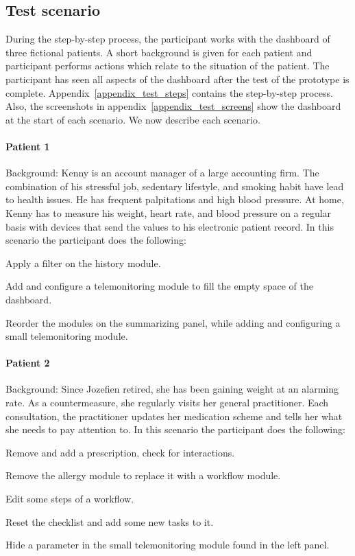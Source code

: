     \subsection{Test scenario}

    During the step-by-step process, the participant works with the dashboard of three fictional patients. A short background is given for each patient and participant performs actions which relate to the situation of the patient. The participant has seen all aspects of the dashboard after the test of the prototype is complete. Appendix~\ref{appendix_test_steps} contains the step-by-step process. Also, the screenshots in appendix~\ref{appendix_test_screens} show the dashboard at the start of each scenario. We now describe each scenario.

    \paragraph{Patient 1} Background: Kenny is an account manager of a large accounting firm. The combination of his stressful job, sedentary lifestyle, and smoking habit have lead to health issues. He has frequent palpitations and high blood pressure. At home, Kenny has to measure his weight, heart rate, and blood pressure on a regular basis with devices that send the values to his electronic patient record. In this scenario the participant does the following:
    \vspace{-6pt}
    \begin{myenumerate}
        \item Apply a filter on the history module.
        \item Add and configure a telemonitoring module to fill the empty space of the dashboard.
        \item Reorder the modules on the summarizing panel, while adding and configuring a small telemonitoring module.
    \end{myenumerate}

    \paragraph{Patient 2} Background: Since Jozefien retired, she has been gaining weight at an alarming rate. As a countermeasure, she regularly visits her general practitioner. Each consultation, the practitioner updates her medication scheme and tells her what she needs to pay attention to. In this scenario the participant does the following:
    \vspace{-6pt}
    \begin{myenumerate}
        \item Remove and add a prescription, check for interactions.
        \item Remove the allergy module to replace it with a workflow module.
        \item Edit some steps of a workflow.
        \item Reset the checklist and add some new tasks to it.
        \item Hide a parameter in the small telemonitoring module found in the left panel.
    \end{myenumerate}

